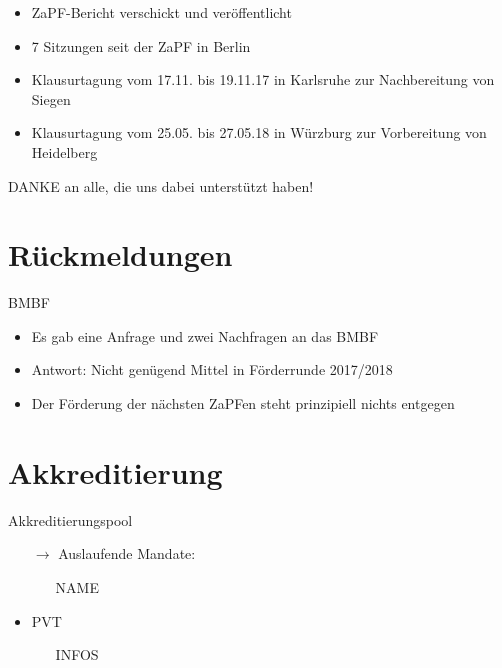 \documentclass[compress, aspectratio=169]{beamer}
\begin{document}
\begin{frame}
  \begin{itemize}
    \item ZaPF-Bericht verschickt und veröffentlicht
    \item 7 Sitzungen seit der ZaPF in Berlin
    \item Klausurtagung vom 17.11. bis 19.11.17 in Karlsruhe zur Nachbereitung von Siegen
    \item Klausurtagung vom 25.05. bis 27.05.18 in Würzburg zur Vorbereitung von Heidelberg
    \end{itemize}
    \vspace{5mm}
    \begin{center}
      \Large DANKE an alle, die uns dabei unterstützt haben!
    \end{center}
\end{frame}

\section{Rückmeldungen}

\begin{frame}{BMBF}
  \begin{itemize}
     \item Es gab eine Anfrage und zwei Nachfragen an das BMBF
     \item Antwort: Nicht genügend Mittel in Förderrunde 2017/2018
     \item Der Förderung der nächsten ZaPFen steht prinzipiell nichts entgegen
  \end{itemize}
\end{frame}


\section{Akkreditierung}

\begin{frame}{Akkreditierungspool}
  \begin{itemize}
    \item[$\rightarrow$] Auslaufende Mandate:
      \begin{itemize}
          \item [NAME]
      \end{itemize}
    \item PVT
      \begin{itemize}
          \item [INFOS]
      \end{itemize}
    \end{itemize}
\end{frame}
\end{document}
